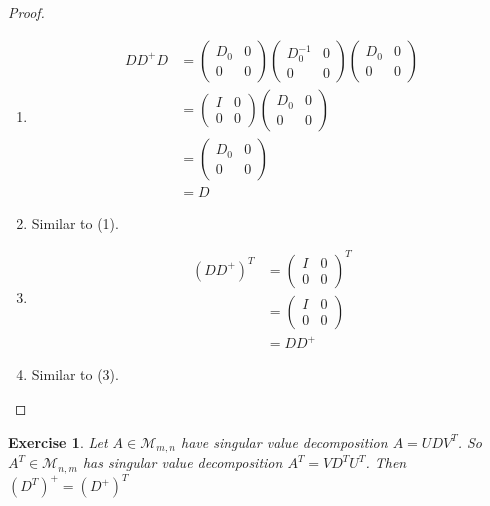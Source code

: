 \documentclass[12pt]{amsart}
\newtheorem{ex}[thm]{Exercise}
\newcommand{\MM}{\mathcal{M}}
\begin{document}
\begin{proof}\
\begin{enumerate}
\item 
\begin{align*}
DD^+D 
&= \begin{pmatrix}
D_0 & 0 \\
0 & 0
\end{pmatrix} 
\begin{pmatrix}
D_0^{-1} & 0 \\
0 & 0
\end{pmatrix} 
\begin{pmatrix}
D_0 & 0 \\
0 & 0
\end{pmatrix} \\
&= \begin{pmatrix}
I & 0 \\
0 & 0
\end{pmatrix}
\begin{pmatrix}
D_0 & 0 \\
0 & 0
\end{pmatrix} \\ 
&= \begin{pmatrix}
D_0 & 0 \\
0 & 0
\end{pmatrix} \\
&= D
\end{align*}
\item Similar to (1).
\item 
\begin{align*}
(DD^{+})^T
&=\begin{pmatrix}
I & 0 \\
0 & 0
\end{pmatrix}^T \\
&= \begin{pmatrix}
I & 0 \\
0 & 0
\end{pmatrix} \\
&= DD^{+}
\end{align*}
\item Similar to (3).
\end{enumerate}

\end{proof}

\begin{ex}
Let $A \in \MM_{m, n}$ have singular value decomposition $A = UDV^T$. So $A^T \in \MM_{n,m}$ has singular value decomposition $A^T = VD^TU^T$.
Then $(D^T)^+ = (D^+)^T$
\end{ex}
\end{document}
